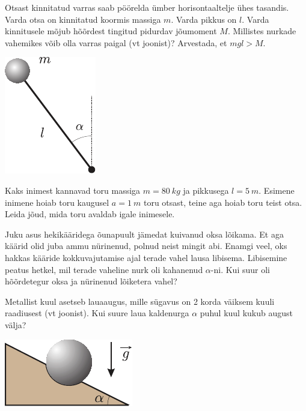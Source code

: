 \documentclass[10pt, twoside]{article}
\begin{document}
{
Otsast kinnitatud varras saab pöörelda ümber horisontaaltelje ühes tasandis. Varda otsa on kinnitatud koormis massiga $m$. Varda pikkus on $l$. Varda kinnitusele mõjub hõõrdest tingitud pidurdav jõumoment $M$. Millistes nurkade vahemikes võib olla varras paigal (vt joonist)? Arvestada, et $mgl > M$.
\begin{center}
	\includegraphics[width=0.3\linewidth]{2008-v2g-01-yl}
\end{center}
\probend
\bigskip


Kaks inimest kannavad toru massiga $m = \SI{80}{kg}$ ja pikkusega $l = \SI{5}{m}$. Esimene inimene hoiab toru kaugusel $a = \SI{1}{m}$ toru otsast, teine aga hoiab toru teist otsa. Leida jõud, mida toru avaldab igale inimesele.
\probend
\bigskip


Juku asus hekikääridega õunapuult jämedat kuivanud oksa lõikama. Et aga käärid olid juba ammu nürinenud, polnud neist mingit abi. Enamgi veel, oks hakkas kääride kokkuvajutamise ajal terade vahel lausa libisema. Libisemine peatus hetkel, mil terade vaheline nurk oli kahanenud $\alpha$-ni. Kui suur oli hõõrdetegur oksa ja nürinenud lõiketera vahel?
\probend
\bigskip


Metallist kuul asetseb lauaaugus, mille sügavus on 2 korda väiksem kuuli raadiusest (vt joonist). Kui suure laua kaldenurga $\alpha$ puhul kuul kukub august välja? 

\begin{center}
	\includegraphics[width=0.4\linewidth]{2005-lahg-03-yl}
\end{center}
\probend
\bigskip

}
\end{document}
